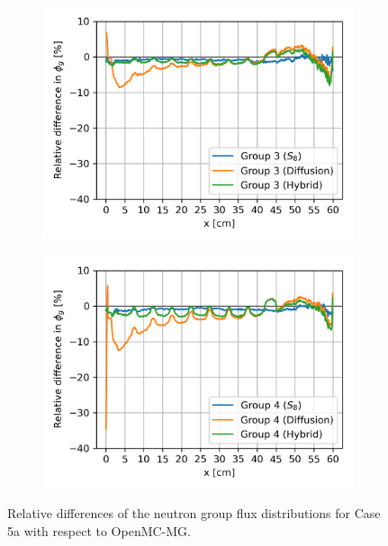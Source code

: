 \begin{frame}
\begin{figure}[htb!]
\begin{subfigure}[t]{.34\textwidth}
      \centering
      \includegraphics[width=\textwidth]{../images/case-5a-group-3-flux-error}
      \label{fig:c5ag3e}
    \end{subfigure}
    \begin{subfigure}[t]{.34\textwidth}
      \centering
      \includegraphics[width=\textwidth]{../images/case-5a-group-4-flux-error}
      \label{fig:c5ag4e}
    \end{subfigure}
    \caption{Relative differences of the neutron group flux distributions for Case 5a with respect
    to OpenMC-MG.}
    \label{fig:c5afluxe}
  \end{figure}
\end{frame}


